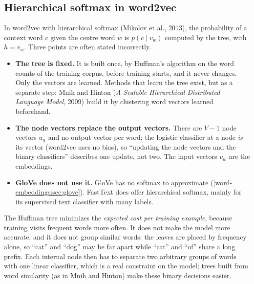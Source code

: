 \begin{notechapter}
\section{Hierarchical softmax in word2vec}\label{hierarchical-softmax:sec:word2vec}

In word2vec with hierarchical softmax (Mikolov et al., 2013), the probability of a context word
$c$ given the centre word $w$ is $p(c\mid v_w)$ computed by the tree, with $h = v_w$. Three points are often stated
incorrectly.
\begin{itemize}
  \item \textbf{The tree is fixed.} It is built once, by Huffman's algorithm on the word counts of the
        training corpus, before training starts, and it never changes. Only the vectors are
        learned. Methods that learn the tree exist, but as a separate step: Mnih and Hinton
        (\emph{A Scalable Hierarchical Distributed Language Model}, 2009) build it by clustering
        word vectors learned beforehand.
  \item \textbf{The node vectors replace the output vectors.} There are $V - 1$ node vectors $u_n$ and no output
        vector per word; the logistic classifier at a node \emph{is} its vector (word2vec uses no
        bias), so ``updating the node vectors and the binary classifiers'' describes one
        update, not two. The input vectors $v_w$ are the embeddings.
  \item \textbf{GloVe does not use it.} GloVe has no softmax to approximate
        (\cref{word-embeddings:sec:glove}). FastText does offer hierarchical softmax, mainly for
        its supervised text classifier with many labels.
\end{itemize}

\begin{pitfall}
The Huffman tree minimizes the \emph{expected cost per training example}, because training
visits frequent words more often. It does not make the model more accurate, and it does not
group similar words: the leaves are placed by frequency alone, so ``cat'' and ``dog'' may be
far apart while ``cat'' and ``of'' share a long prefix. Each internal node then has to
separate two arbitrary groups of words with one linear classifier, which is a real
constraint on the model; trees built from word similarity (as in Mnih and Hinton) make these
binary decisions easier.
\end{pitfall}


\end{notechapter}
